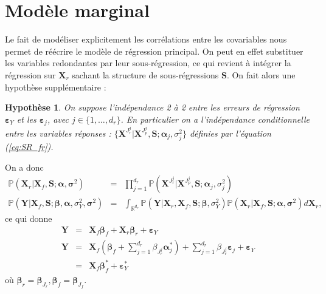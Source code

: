 \documentclass[12pt,a4paper]{report}
\newtheorem{hypfr}{Hypothèse}
\begin{document}
	\section{Modèle marginal}
	Le fait de modéliser explicitement les corrélations entre les covariables nous permet de réécrire le modèle de régression principal. On peut en effet substituer les variables redondantes par leur sous-régression, ce qui revient à intégrer la régression sur $\boldsymbol{X}_{r}$ sachant la structure de sous-régressions $\boldsymbol{S}$. On fait alors une hypothèse supplémentaire :

\begin{hypfr}\label{H3fr}
On suppose l'indépendance 2 à 2 entre les erreurs de régression $\boldsymbol{\varepsilon}_Y$ et les $\boldsymbol{\varepsilon}_j$, avec  $j\in \{1,\dots,d_r\}$. En particulier on a l'indépendance conditionnelle entre les variables réponses : $\{\boldsymbol{X}^{J_r^j}|\boldsymbol{X}^{J_p^j},\boldsymbol{S};\boldsymbol{\alpha}_j,\sigma_j^2\}$ définies par l'équation (\ref{eq:SR_fr}).
\end{hypfr}
On a donc 
\begin{eqnarray}
		\mathbb{P}(\boldsymbol{X}_r|\boldsymbol{X}_f,\boldsymbol{S};\boldsymbol{\alpha},\boldsymbol{\sigma}^2)&=&\prod_{j=1}^{d_r}\mathbb{P}(\boldsymbol{X}^{J_r^j}|\boldsymbol{X}^{J_p^j},\boldsymbol{S};\boldsymbol{\alpha}_j,\sigma^2_j)	 \nonumber \\
		\mathbb{P}(\boldsymbol{Y}|\boldsymbol{X}_{f},\boldsymbol{S};\boldsymbol{\beta},\boldsymbol{\alpha},\sigma^2_Y ,\boldsymbol{\sigma}^2)&=& \int_{\mathbb{R}^{d_r}}\mathbb{P}(\boldsymbol{Y}|\boldsymbol{X}_{r},\boldsymbol{X}_{f},\boldsymbol{S};\boldsymbol{\beta},\sigma_Y^2)\mathbb{P}(\boldsymbol{X}_r|\boldsymbol{X}_f,\boldsymbol{S};\boldsymbol{\alpha},\boldsymbol{\sigma}^2) d \boldsymbol{X}_{r}, \textrm{ \ \ \ \ } \nonumber 
		\end{eqnarray}
		ce qui donne
		\begin{eqnarray}
		\boldsymbol{Y}%
		&=& \boldsymbol{X}_f\boldsymbol{\beta}_f+\boldsymbol{X}_r\boldsymbol{\beta}_r+\boldsymbol{\varepsilon}_Y \nonumber \\
	\boldsymbol{Y}%
	&=&\boldsymbol{X}_{f} (\boldsymbol{\beta}_{f}+ \sum_{j =1}^{d_r}\beta_{J_r^j}\boldsymbol{\alpha}^*_j)+  \sum_{j =1}^{d_r}\beta_{J_r^j}\boldsymbol{\varepsilon}_j+\boldsymbol{\varepsilon}_Y  \label{marginalfr} \\
	&=&\boldsymbol{X}_{f}\boldsymbol{\beta}_{f}^*+\boldsymbol{\varepsilon}_Y^*  \nonumber 
\end{eqnarray}
où $\boldsymbol{\beta}_r=\boldsymbol{\beta}_{J_r}, \boldsymbol{\beta}_f=\boldsymbol{\beta}_{J_f}$.%
\\
\end{document}
